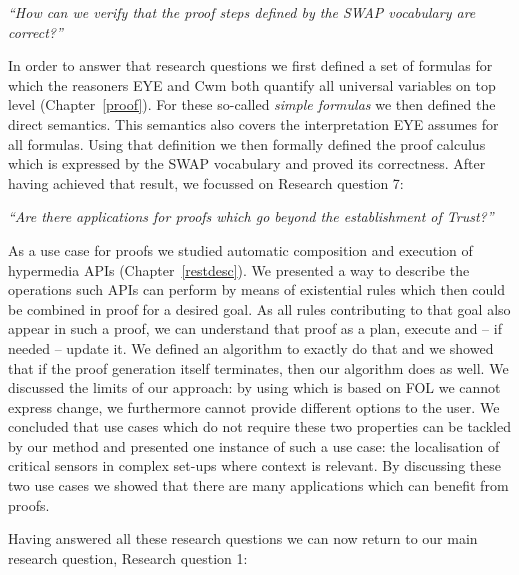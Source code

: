 \emph{``How can we verify that the proof steps defined by the SWAP vocabulary are correct?''}

In order to answer that research questions we first defined a set of formulas for which the reasoners EYE and Cwm both quantify all universal variables on top level (Chapter~\ref{proof}).
For these so-called \emph{simple formulas} we then defined the direct semantics. This semantics also covers the interpretation EYE assumes for all formulas.
Using that definition we then formally defined the proof calculus which is expressed by the SWAP vocabulary and proved its correctness.
After having achieved that result, we focussed on Research question 7:



\textit{ 
``Are there applications for \nthree proofs which go beyond the establishment of \emph{Trust}?''
}

As a use case for \nthree proofs we studied automatic composition and execution of hypermedia APIs (Chapter~\ref{restdesc}). We presented a way 
to describe the operations such APIs can perform by means of existential rules which then could be combined in proof for a desired goal. 
As all rules contributing to that goal also appear in such a proof, we can understand that proof as a plan, execute and -- if needed -- update it.
We defined an algorithm to exactly do that and we showed that if the proof generation itself terminates, then our algorithm does as well.
We discussed the limits of our approach: by using \nthree which is based on FOL we cannot express change, we furthermore cannot provide different options to the user.
We concluded that use cases which do not require these two properties can be tackled by our method and presented one instance of such a use case: the localisation of critical 
sensors in complex set-ups where context is relevant. By discussing these two use cases we showed that there are many applications which can benefit from \nthree proofs.

Having answered all these research questions we can now return to our main research question, Research question 1:

